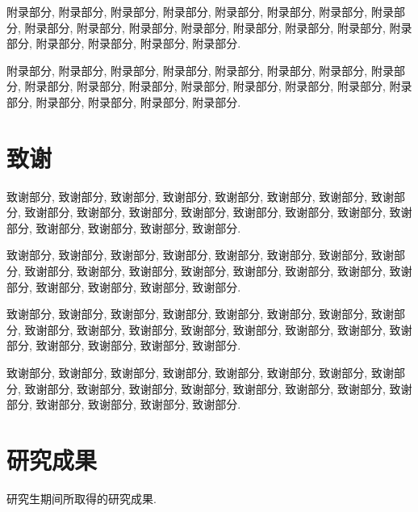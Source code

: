 \documentclass[UTF8,openright]{ctexbook}
\begin{document}
附录部分, 附录部分, 附录部分, 附录部分, 附录部分,
附录部分, 附录部分, 附录部分, 附录部分, 附录部分,
附录部分, 附录部分, 附录部分, 附录部分, 附录部分,
附录部分, 附录部分, 附录部分, 附录部分, 附录部分.

附录部分, 附录部分, 附录部分, 附录部分, 附录部分,
附录部分, 附录部分, 附录部分, 附录部分, 附录部分,
附录部分, 附录部分, 附录部分, 附录部分, 附录部分,
附录部分, 附录部分, 附录部分, 附录部分, 附录部分.


\clearpage{\pagestyle{empty}\cleardoublepage}
\chapter*{致谢}

致谢部分, 致谢部分, 致谢部分, 致谢部分, 致谢部分,
致谢部分, 致谢部分, 致谢部分, 致谢部分, 致谢部分,
致谢部分, 致谢部分, 致谢部分, 致谢部分, 致谢部分,
致谢部分, 致谢部分, 致谢部分, 致谢部分, 致谢部分.

致谢部分, 致谢部分, 致谢部分, 致谢部分, 致谢部分,
致谢部分, 致谢部分, 致谢部分, 致谢部分, 致谢部分,
致谢部分, 致谢部分, 致谢部分, 致谢部分, 致谢部分,
致谢部分, 致谢部分, 致谢部分, 致谢部分, 致谢部分.

致谢部分, 致谢部分, 致谢部分, 致谢部分, 致谢部分,
致谢部分, 致谢部分, 致谢部分, 致谢部分, 致谢部分,
致谢部分, 致谢部分, 致谢部分, 致谢部分, 致谢部分,
致谢部分, 致谢部分, 致谢部分, 致谢部分, 致谢部分.

致谢部分, 致谢部分, 致谢部分, 致谢部分, 致谢部分,
致谢部分, 致谢部分, 致谢部分, 致谢部分, 致谢部分,
致谢部分, 致谢部分, 致谢部分, 致谢部分, 致谢部分,
致谢部分, 致谢部分, 致谢部分, 致谢部分, 致谢部分.

\clearpage{\pagestyle{empty}\cleardoublepage}
\chapter*{研究成果}

研究生期间所取得的研究成果.
\end{document}
